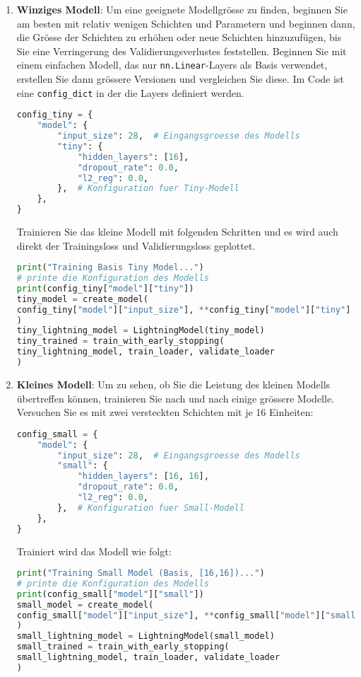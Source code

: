 \documentclass[11pt,a4paper,headinclude]{scrartcl}
\begin{document}
\begin{Aufgabe}
\begin{enumerate}
		
		\item \textbf{Winziges Modell}: Um eine geeignete Modellgrösse zu finden, beginnen Sie am besten mit relativ wenigen Schichten und Parametern und beginnen dann, die Grösse der Schichten zu erhöhen oder neue Schichten hinzuzufügen, bis Sie eine Verringerung des Validierungsverlustes feststellen. Beginnen Sie mit einem einfachen Modell, das nur \texttt{nn.Linear}-Layers als Basis verwendet, erstellen Sie dann grössere Versionen und vergleichen Sie diese. Im Code ist eine \texttt{config\_dict} in der die Layers definiert werden.
		
		\begin{lstlisting}[language=Python]
config_tiny = {
	"model": {
		"input_size": 28,  # Eingangsgroesse des Modells
		"tiny": {
			"hidden_layers": [16],
			"dropout_rate": 0.0,
			"l2_reg": 0.0,
		},  # Konfiguration fuer Tiny-Modell
	},
}
		\end{lstlisting}
		
		Trainieren Sie das kleine Modell mit folgenden Schritten und es wird auch direkt der Trainingsloss und Validierungsloss geplottet.
		\begin{lstlisting}[language=Python]
print("Training Basis Tiny Model...")
# printe die Konfiguration des Modells
print(config_tiny["model"]["tiny"])
tiny_model = create_model(
config_tiny["model"]["input_size"], **config_tiny["model"]["tiny"]
)
tiny_lightning_model = LightningModel(tiny_model)
tiny_trained = train_with_early_stopping(
tiny_lightning_model, train_loader, validate_loader
)

		\end{lstlisting}
		
		
		\item \textbf{Kleines Modell}: Um zu sehen, ob Sie die Leistung des kleinen Modells übertreffen können, trainieren Sie nach und nach einige grössere Modelle. Versuchen Sie es mit zwei versteckten Schichten mit je 16 Einheiten:
		
		\begin{lstlisting}[language=Python]
config_small = {
	"model": {
		"input_size": 28,  # Eingangsgroesse des Modells
		"small": {
			"hidden_layers": [16, 16],
			"dropout_rate": 0.0,
			"l2_reg": 0.0,
		},  # Konfiguration fuer Small-Modell
	},
}
		\end{lstlisting}
		
		Trainiert wird das Modell wie folgt:
		\begin{lstlisting}[language=Python]
print("Training Small Model (Basis, [16,16])...")
# printe die Konfiguration des Modells
print(config_small["model"]["small"])
small_model = create_model(
config_small["model"]["input_size"], **config_small["model"]["small"]
)
small_lightning_model = LightningModel(small_model)
small_trained = train_with_early_stopping(
small_lightning_model, train_loader, validate_loader
)
		\end{lstlisting}
		

\end{enumerate}
\end{Aufgabe}
\end{document}
